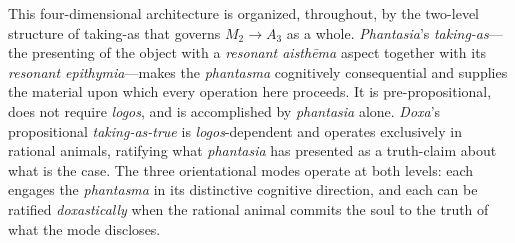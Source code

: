 \documentclass{article}
\begin{document}
This four-dimensional architecture is organized, throughout, by the two-level structure of taking-as that governs $M_2 \rightarrow A_3$ as a whole. \textit{Phantasia}'s \textit{taking-as}---the presenting of the object with a \textit{resonant aisthēma} aspect together with its \textit{resonant epithymia}---makes the \textit{phantasma} cognitively consequential and supplies the material upon which every operation here proceeds. It is pre-propositional, does not require \textit{logos}, and is accomplished by \textit{phantasia} alone. \textit{Doxa}'s propositional \textit{taking-as-true} is \textit{logos}-dependent and operates exclusively in rational animals, ratifying what \textit{phantasia} has presented as a truth-claim about what is the case. The three orientational modes operate at both levels: each engages the \textit{phantasma} in its distinctive cognitive direction, and each can be ratified \textit{doxastically} when the rational animal commits the soul to the truth of what the mode discloses. 
\end{document}
